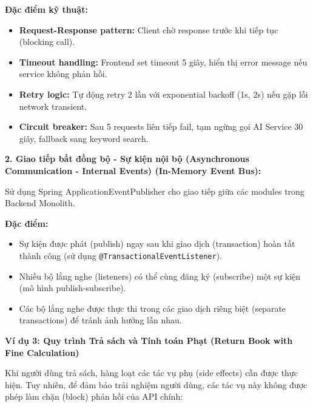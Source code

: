 \textbf{Đặc điểm kỹ thuật:}
\begin{itemize}
    \item \textbf{Request-Response pattern:} Client chờ response trước khi tiếp tục (blocking call).
    \item \textbf{Timeout handling:} Frontend set timeout 5 giây, hiển thị error message nếu service không phản hồi.
    \item \textbf{Retry logic:} Tự động retry 2 lần với exponential backoff (1s, 2s) nếu gặp lỗi network transient.
    \item \textbf{Circuit breaker:} Sau 5 requests liên tiếp fail, tạm ngừng gọi AI Service 30 giây, fallback sang keyword search.
\end{itemize}

\textbf{2. Giao tiếp bất đồng bộ - Sự kiện nội bộ (Asynchronous Communication - Internal Events) (In-Memory Event Bus):}

Sử dụng Spring ApplicationEventPublisher cho giao tiếp giữa các modules trong Backend Monolith.

\textbf{Đặc điểm:}
\begin{itemize}
    \item Sự kiện được phát (publish) ngay sau khi giao dịch (transaction) hoàn tất thành công (sử dụng \texttt{@TransactionalEventListener}).
    \item Nhiều bộ lắng nghe (listeners) có thể cùng đăng ký (subscribe) một sự kiện (mô hình publish-subscribe).
    \item Các bộ lắng nghe được thực thi trong các giao dịch riêng biệt (separate transactions) để tránh ảnh hưởng lẫn nhau.
\end{itemize}
\textbf{Ví dụ 3: Quy trình Trả sách và Tính toán Phạt (Return Book with Fine Calculation)}

Khi người dùng trả sách, hàng loạt các tác vụ phụ (side effects) cần được thực hiện. Tuy nhiên, để đảm bảo trải nghiệm người dùng, các tác vụ này không được phép làm chặn (block) phản hồi của API chính:

